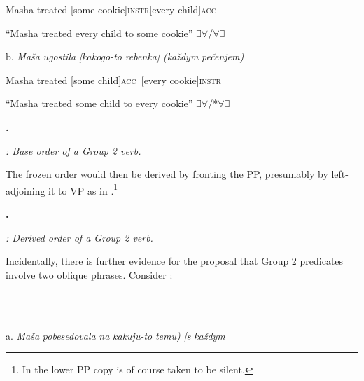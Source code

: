 \documentclass[output=paper,modfonts, nonflat]{langsci/langscibook}
\begin{document}
\begin{styleinnerExample}
    Masha treated   [some       cookie]\textsc{instr}[every     child]\textsc{acc}
\end{styleinnerExample}

\begin{styleinnerExample}
    “Masha treated every child to some cookie” ${\exists}{\forall}$/${\forall}{\exists}$
\end{styleinnerExample}

\begin{styleinnerExample}
  b.  \textit{Maša}   \textit{ugostila} \textit{[kakogo-to} \textit{rebenka]}  \textit{(každym} \textit{pečenjem)}
\end{styleinnerExample}

\begin{styleinnerExample}
    Masha treated   [some         child]\textsc{acc~}[every    cookie]\textsc{instr}
\end{styleinnerExample}

\begin{styleinnerExample}
    “Masha treated some child to every cookie” ${\exists}{\forall}$/*${\forall}{\exists}$
\end{styleinnerExample}

\textbf{.} 

  
 

\textit{: Base order of a Group 2 verb.}

The frozen order would then be derived by fronting the PP, presumably by left-adjoining it to VP as in .\footnote{In  the lower PP copy is of course taken to be silent.}  

\textbf{.}

  
 

\textit{: Derived order of a Group 2 verb.}

Incidentally, there is further evidence for the proposal that Group 2 predicates involve two oblique phrases. Consider :

\begin{styleinnerExample}
\ea%
    \label{ex:key:53}
    \gll\\
        \\
    \glt
    \z

           a.  \textit{Maša}  \textit{pobesedovala} \textit{na} \textit{kakuju-to} \textit{temu)}             \textit{[s}       \textit{každym}
\end{styleinnerExample}
\end{document}
